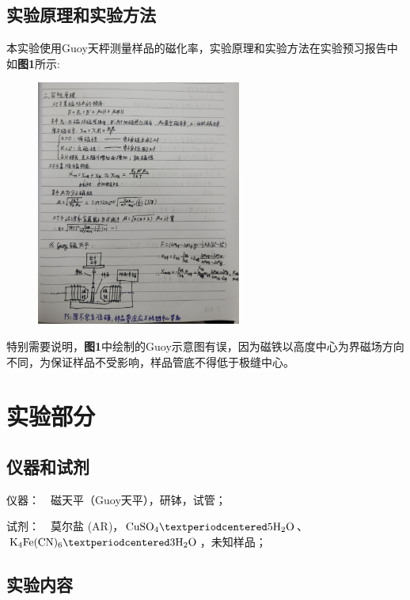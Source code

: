 \documentclass[12pt]{article}
\begin{document}
		\subsection{实验原理和实验方法}
				本实验使用Guoy天枰测量样品的磁化率，实验原理和实验方法在实验预习报告中如\textbf{图1}所示: \par
		\begin{figure}[h]
			\centering
			\includegraphics[width=0.6\textwidth]{1.png}
		\end{figure}
				特别需要说明，\textbf{图1}中绘制的Guoy示意图有误，因为磁铁以高度中心为界磁场方向不同，为保证样品不受影响，样品管底不得低于极缝中心。


               
	\vbox{} %
	     
    \section{实验部分}
    	\subsection{仪器和试剂}
    		仪器：\ \  磁天平（Guoy天平），研钵，试管；\par
			试剂：\ \  莫尔盐 (AR)，$\rm{CuSO_{4}·5H_{2}O}$、$\rm{K_{4}Fe(CN)_{6}·3H_{2}O}$，未知样品；\par
    			
    	 \subsection{实验内容}
\end{document}
